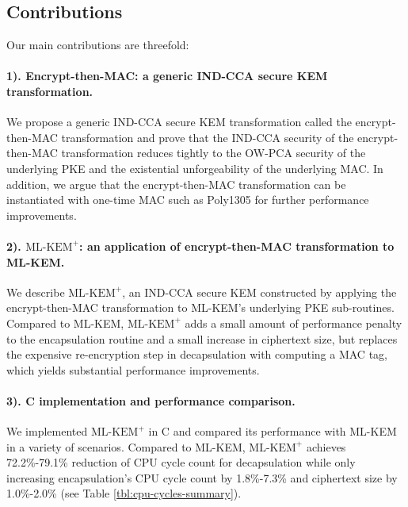 \documentclass[journal=tches,submission]{iacrtrans}
\def\mlkemplus{\text{ML-KEM}^+}
\begin{document}
\subsection{Contributions}
Our main contributions are threefold:

\paragraph{1). Encrypt-then-MAC: a generic IND-CCA secure KEM transformation.} We propose a generic IND-CCA secure KEM transformation called the encrypt-then-MAC transformation and prove that the IND-CCA security of the encrypt-then-MAC transformation reduces tightly to the OW-PCA security of the underlying PKE and the existential unforgeability of the underlying MAC. In addition, we argue that the encrypt-then-MAC transformation can be instantiated with one-time MAC such as Poly1305 for further performance improvements.

\paragraph{2). $\mlkemplus$: an application of encrypt-then-MAC transformation to ML-KEM.} We describe $\mlkemplus$, an IND-CCA secure KEM constructed by applying the encrypt-then-MAC transformation to ML-KEM's underlying PKE sub-routines. Compared to ML-KEM, $\mlkemplus$ adds a small amount of performance penalty to the encapsulation routine and a small increase in ciphertext size, but replaces the expensive re-encryption step in decapsulation with computing a MAC tag, which yields substantial performance improvements.

\paragraph{3). C implementation and performance comparison.} We implemented $\mlkemplus$ in C and compared its performance with ML-KEM in a variety of scenarios. Compared to ML-KEM, $\mlkemplus$ achieves 72.2\%-79.1\% reduction of CPU cycle count for decapsulation while only increasing encapsulation's CPU cycle count by 1.8\%-7.3\% and ciphertext size by 1.0\%-2.0\% (see Table \ref{tbl:cpu-cycles-summary}).
\end{document}
